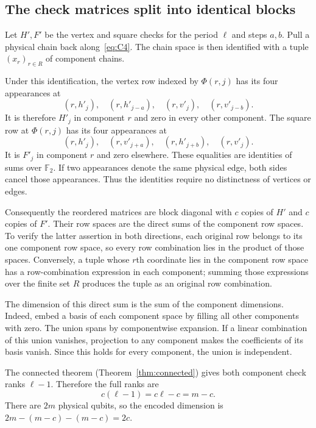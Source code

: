 \documentclass{article}
\numberwithin{equation}{section}
\begin{document}
\subsection{The check matrices split into identical blocks}\label{sec:II-blocks}

Let \(H',F'\) be the vertex and square checks for the period \(\ell\) and
steps \(a,b\). Pull a physical chain back along~\eqref{eq:C4}. The chain space is
then identified with a tuple \((x_r)_{r\in R}\) of component chains.

Under this identification, the vertex row indexed by \(\Phi(r,j)\)
has its four appearances at
\begin{equation}\label{eq:vertex-appearances}
  (r,h'_j),\quad(r,h'_{j-a}),\quad
  (r,v'_j),\quad(r,v'_{j-b}).
\end{equation}
It is therefore \(H'_j\) in component \(r\) and zero in every other
component. The square row at \(\Phi(r,j)\) has its four appearances at
\begin{equation}\label{eq:square-appearances}
  (r,h'_j),\quad(r,v'_{j+a}),\quad
  (r,h'_{j+b}),\quad(r,v'_j).
\end{equation}
It is \(F'_j\) in component \(r\) and zero elsewhere. These equalities
are identities of sums over \(\mathbb F_2\). If two appearances denote
the same physical edge, both sides cancel those appearances. Thus the
identities require no distinctness of vertices or edges.

Consequently the reordered matrices are block diagonal with \(c\)
copies of \(H'\) and \(c\) copies of \(F'\). Their row spaces are the direct
sums of the component row spaces. To verify the latter assertion in
both directions, each original row belongs to its one component
row space, so every row combination lies in the product of those
spaces. Conversely, a tuple whose \(r\)th coordinate lies in the
component row space has a row-combination expression in each
component; summing those expressions over the finite set \(R\)
produces the tuple as an original row combination.

The dimension of this direct sum is the sum of the component
dimensions. Indeed, embed a basis of each component space by filling
all other components with zero. The union spans by componentwise
expansion. If a linear combination of this union vanishes, projection
to any component makes the coefficients of its basis vanish. Since
this holds for every component, the union is independent.

The connected theorem (Theorem~\ref{thm:connected}) gives both component check ranks
\(\ell-1\).
Therefore the full ranks are
\begin{equation}\label{eq:full-ranks}
  c(\ell-1)=c\ell-c=m-c.
\end{equation}
There are \(2m\) physical qubits, so the encoded dimension is
\(2m-(m-c)-(m-c)=2c\).
\end{document}

